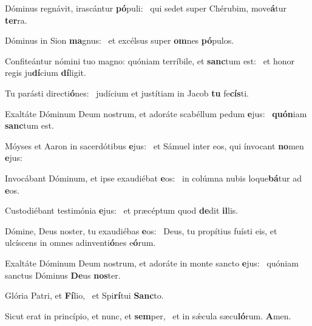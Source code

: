 \item Dóminus regnávit, irascántur \textbf{pó}puli:~\psstar{} qui sedet super Chérubim, move\textbf{á}tur \textbf{ter}ra.

\item Dóminus in Sion \textbf{ma}gnus:~\psstar{} et excélsus super \textbf{om}nes \textbf{pó}pulos.

\item Confiteántur nómini tuo magno: quóniam terríbile, et \textbf{sanc}tum est:~\psstar{} et honor regis ju\textbf{dí}cium \textbf{dí}ligit.

\item Tu parásti directi\textbf{ó}nes:~\psstar{} judícium et justítiam in Jacob \textbf{tu} fe\textbf{cís}ti.

\item Exaltáte Dóminum Deum nostrum, et adoráte scabéllum pedum \textbf{e}jus:~\psstar{} \textbf{quón}iam \textbf{sanc}tum est.

\item Móyses et Aaron in sacerdótibus \textbf{e}jus:~\psstar{} et Sámuel inter eos, qui ínvocant \textbf{no}men \textbf{e}jus:

\item Invocábant Dóminum, et ipse exaudiébat \textbf{e}os:~\psstar{} in colúmna nubis loque\textbf{bá}tur ad \textbf{e}os.

\item Custodiébant testimónia \textbf{e}jus:~\psstar{} et præcéptum quod \textbf{de}dit \textbf{il}lis.

\item Dómine, Deus noster, tu exaudiébas \textbf{e}os:~\psstar{} Deus, tu propítius fuísti eis, et ulcíscens in omnes adinventi\textbf{ó}nes e\textbf{ó}rum.

\item Exaltáte Dóminum Deum nostrum, et adoráte in monte sancto \textbf{e}jus:~\psstar{} quóniam sanctus Dóminus \textbf{De}us \textbf{nos}ter.

\item Glória Patri, et \textbf{Fí}lio,~\psstar{} et Spi\textbf{rí}tui \textbf{Sanc}to.

\item Sicut erat in princípio, et nunc, et \textbf{sem}per,~\psstar{} et in sǽcula sæcu\textbf{ló}rum. \textbf{A}men.
